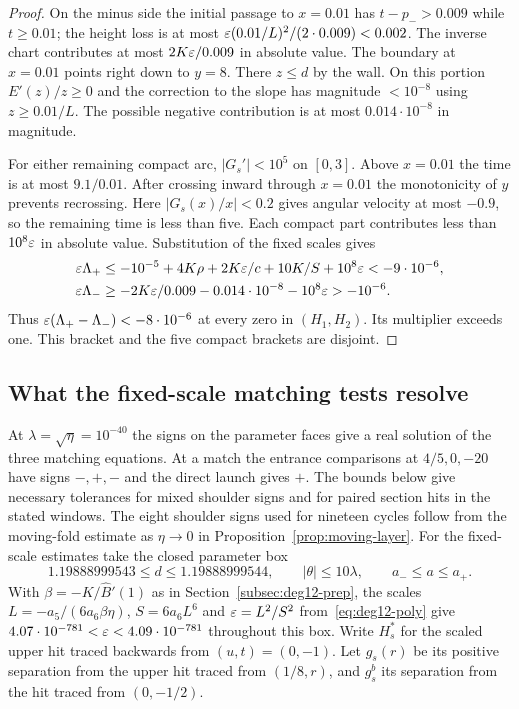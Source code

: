 \begin{proof}
On the minus side the initial passage to $x=0.01$ has $t-p_->0.009$
while $t\ge0.01$; the height loss is at most
$\varepsilon(0.01/L)^2/(2\cdot0.009)<0.002$. The inverse chart contributes
at most $2K\varepsilon/0.009$ in absolute value. The boundary at $x=0.01$
points right down to $y=8$. There $z\le d$ by the wall. On this
portion $E'(z)/z\ge0$ and the correction to the slope has magnitude
$<10^{-8}$ using $z\ge0.01/L$. The possible negative contribution
is at most $0.014\cdot10^{-8}$ in magnitude.

For either remaining compact arc, $|G_s'|<10^5$ on $[0,3]$.
Above $x=0.01$ the time is at most $9.1/0.01$. After crossing
inward through $x=0.01$ the monotonicity of $y$ prevents recrossing.
Here $|G_s(x)/x|<0.2$ gives angular velocity at most $-0.9$, so
the remaining time is less than five. Each compact part contributes
less than $10^8\varepsilon$ in absolute value. Substitution of the fixed
scales gives
\begin{align*}
 \varepsilon \Lambda_+ &\le -10^{-5}+4K\rho+2K\varepsilon/c+10K/S+10^8\varepsilon<-9\cdot10^{-6},\\
 \varepsilon \Lambda_- &\ge -2K\varepsilon/0.009-0.014\cdot10^{-8}-10^8\varepsilon>-10^{-6}.
\end{align*}
Thus $\varepsilon(\Lambda_+-\Lambda_-)<-8\cdot10^{-6}$ at every zero in
$(H_1,H_2)$. Its multiplier exceeds one. This bracket and the five
compact brackets are disjoint.
\end{proof}

\subsection*{What the fixed-scale matching tests resolve}
At $\lambda=\sqrt\eta=10^{-40}$ the signs on the parameter faces give
a real solution of the three matching equations. At a match the entrance comparisons
at $4/5,0,-20$ have signs $-,+,-$ and the direct launch gives $+$.
The bounds below give necessary tolerances for mixed shoulder signs
and for paired section hits in the stated windows. The eight shoulder
signs used for nineteen cycles follow from the moving-fold estimate
as $\eta\to0$ in Proposition~\ref{prop:moving-layer}. For the fixed-scale
estimates take the closed parameter box
\[
 1.19888999543\le d\le1.19888999544,\qquad
 |\theta|\le10\lambda,\qquad a_-\le a\le a_+ .
\]
With $\beta=-K/\widehat B'(1)$ as in Section~\ref{subsec:deg12-prep},
the scales $L=-a_5/(6a_6\beta\eta)$, $S=6a_6L^6$ and $\varepsilon=L^2/S^2$
from~\eqref{eq:deg12-poly} give $4.07\cdot10^{-781}<\varepsilon<4.09\cdot10^{-781}$
throughout this box.
Write $H_s^*$ for the scaled upper hit traced backwards from
$(u,t)=(0,-1)$. Let $g_s(r)$ be its positive separation from the
upper hit traced from $(1/8,r)$, and $g_s^b$ its separation from
the hit traced from $(0,-1/2)$.

